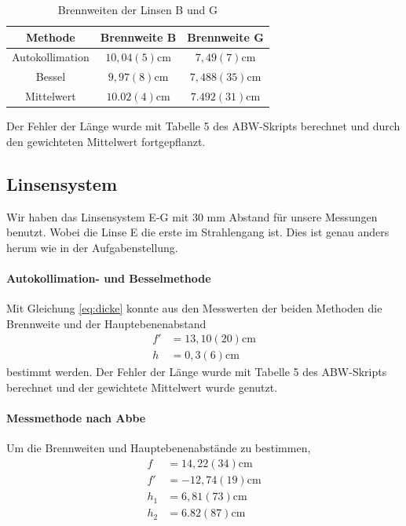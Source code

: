 \documentclass[11pt, a4paper]{article}
\begin{document}
    \begin{table}[h]
        \centering
        \begin{tabular}{c|c|c}
            Methode & Brennweite B & Brennweite G \\ \hline
            Autokollimation & $10,04(5) \si{\centi\metre}$ & $7,49(7) \si{\centi\metre}$ \\ \hline
            Bessel & $9,97(8) \si{\centi\metre}$ & $7,488(35) \si{\centi\metre}$ \\ \hline
            Mittelwert & $10.02(4) \si{\centi\metre}$ & $7.492(31) \si{\centi\metre}$
        \end{tabular}
        \caption{Brennweiten der Linsen B und G}
        \label{tab:ergebnisse}
    \end{table}
    Der Fehler der Länge wurde mit Tabelle 5 des ABW-Skripts \cite{ABW} berechnet und durch den gewichteten Mittelwert fortgepflanzt.

    \subsection{Linsensystem}
    Wir haben das Linsensystem E-G mit $30$ mm Abstand für unsere Messungen benutzt. Wobei die Linse E die erste im Strahlengang ist. Dies ist genau anders herum wie in der Aufgabenstellung.

    \paragraph{Autokollimation- und Besselmethode}
    Mit Gleichung \ref{eq:dicke} konnte aus den Messwerten der beiden Methoden die Brennweite und der Hauptebenenabstand
    \begin{align}
        f' &= 13,10(20) \si{\centi\metre} \\
        h &= 0,3(6) \si{\centi\metre}
    \end{align}
    bestimmt werden. Der Fehler der Länge wurde mit Tabelle 5 des ABW-Skripts \cite{ABW} berechnet und der gewichtete Mittelwert wurde genutzt.

    \paragraph{Messmethode nach Abbe}
    Um die Brennweiten und Hauptebenenabstände zu bestimmen,
    \begin{align}
        f &= 14,22(34) \si{\centi\metre} \\
        f' &= -12,74(19) \si{\centi\metre} \\
        h_1 &= 6,81(73) \si{\centi\metre} \\
        h_2 &= 6.82(87) \si{\centi\metre}
    \end{align}
    
\end{document}

